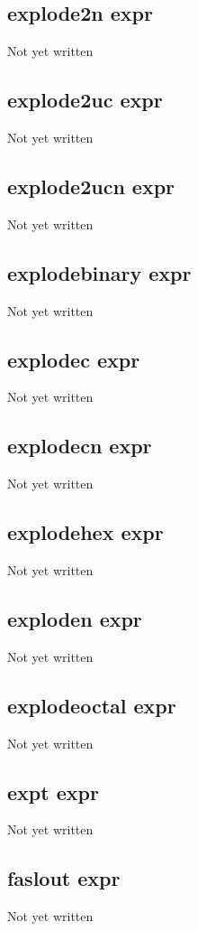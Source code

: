\documentclass[a4paper,11pt]{article}
\begin{document}
\subsection{\ttfamily explode2n expr}
Not yet written

\subsection{\ttfamily explode2uc expr}
Not yet written

\subsection{\ttfamily explode2ucn expr}
Not yet written

\subsection{\ttfamily explodebinary expr}
Not yet written

\subsection{\ttfamily explodec expr}
Not yet written

\subsection{\ttfamily explodecn expr}
Not yet written

\subsection{\ttfamily explodehex expr}
Not yet written

\subsection{\ttfamily exploden expr}
Not yet written

\subsection{\ttfamily explodeoctal expr}
Not yet written

\subsection{\ttfamily expt expr}
Not yet written

\subsection{\ttfamily faslout expr}
Not yet written
\end{document}
